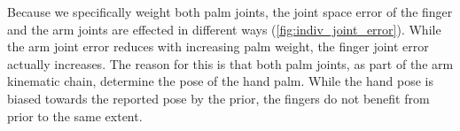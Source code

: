 

Because we specifically weight both palm joints, the joint space error of the finger and the arm joints are effected in different ways (\cref{fig:indiv_joint_error}). While the arm joint error reduces with increasing palm weight, the finger joint error actually increases. The reason for this is that both palm joints, as part of the arm kinematic chain, determine the pose of the hand palm. While the hand pose is biased towards the reported pose by the prior, the fingers do not benefit from prior to the same extent.



